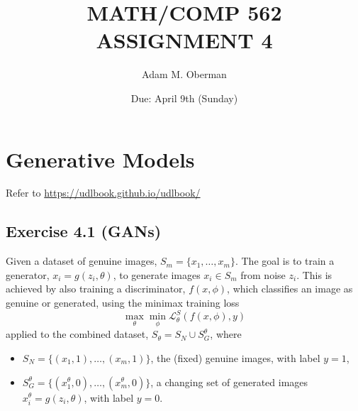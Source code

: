 \documentclass[
10pt, %
a4paper, %
oneside, %
headinclude,footinclude, %
BCOR5mm, %
]{scrartcl}
\title{\normalfont\spacedallcaps{Language reclamation: Literature review}} %
\author{\spacedlowsmallcaps{Caleb Moses*}} %
\date{} %
\begin{document}
\title{MATH/COMP 562 ASSIGNMENT 4}
\date{Due: April 9th (Sunday)}
\author{Adam M. Oberman}
\maketitle

\section*{Generative Models}
Refer to \url{https://udlbook.github.io/udlbook/}

\subsection*{Exercise 4.1 (GANs)}

Given a dataset of genuine images, $S_m = \{x_1, \ldots, x_m\}$. The goal is to train a generator, $x_i = g(z_i, \theta)$, to generate images $x_i \in S_m$ from noise $z_i$. This is achieved by also training a discriminator, $f(x, \phi)$, which classifies an image as genuine or generated, using the minimax training loss
\begin{equation*}
\max_\theta \min_\phi \mathcal{L}^S_\theta(f(x, \phi), y)
\end{equation*}
applied to the combined dataset, $S_\theta = S_N \cup S_G^\theta$,
where
\begin{itemize}
    \item $S_N = \{(x_1, 1), \ldots, (x_m, 1)\}$, the (fixed) genuine images, with label $y = 1$,
    \item $S_G^\theta = \{(x^\theta_1, 0), \ldots, (x^\theta_m, 0)\}$, a changing set of generated images $x^\theta_i = g(z_i, \theta)$, with label $y = 0$.
\end{itemize}




\end{document}
